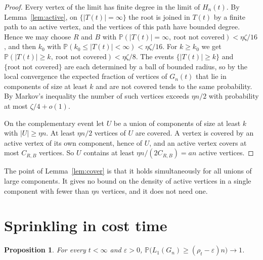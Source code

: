 \documentclass[11pt]{amsart}
\newtheorem{proposition}[theorem]{Proposition}
\theoremstyle{remark}
\numberwithin{equation}{section}
\newcommand{\Pp}{\mathbb P}
\newcommand{\1}{\mathbf 1}
\begin{document}
\begin{proof}
Every vertex of the limit has finite degree in the limit of $H_n(t)$. By Lemma~\ref{lem:active}, on $\{|T(t)|=\infty\}$ the root is joined in $T(t)$ by a finite path to an active vertex, and the vertices of this path have bounded degree. Hence we may choose $R$ and $B$ with $\Pp(|T(t)|=\infty,\ \text{root not covered})<\eta\zeta/16$, and then $k_0$ with $\Pp(k_0\le|T(t)|<\infty)<\eta\zeta/16$. For $k\ge k_0$ we get $\Pp(|T(t)|\ge k,\ \text{root not covered})<\eta\zeta/8$. The events $\{|T(t)|\ge k\}$ and $\{\text{root not covered}\}$ are each determined by a ball of bounded radius, so by the local convergence the expected fraction of vertices of $G_n(t)$ that lie in components of size at least $k$ and are not covered tends to the same probability. By Markov's inequality the number of such vertices exceeds $\eta n/2$ with probability at most $\zeta/4+o(1)$.

On the complementary event let $U$ be a union of components of size at least $k$ with $|U|\ge\eta n$. At least $\eta n/2$ vertices of $U$ are covered. A vertex is covered by an active vertex of its own component, hence of $U$, and an active vertex covers at most $C_{R,B}$ vertices. So $U$ contains at least $\eta n/(2C_{R,B})=an$ active vertices.
\end{proof}

The point of Lemma~\ref{lem:cover} is that it holds simultaneously for all unions of large components. It gives no bound on the density of active vertices in a single component with fewer than $\eta n$ vertices, and it does not need one.

\section{Sprinkling in cost time}\label{sec:sprinkle}

\begin{proposition}\label{prop:lower-t}
For every $t<\infty$ and $\varepsilon>0$, $\Pp\bigl(L_1(G_n)\ge(\rho_t-\varepsilon)n\bigr)\to1$.
\end{proposition}
\end{document}
